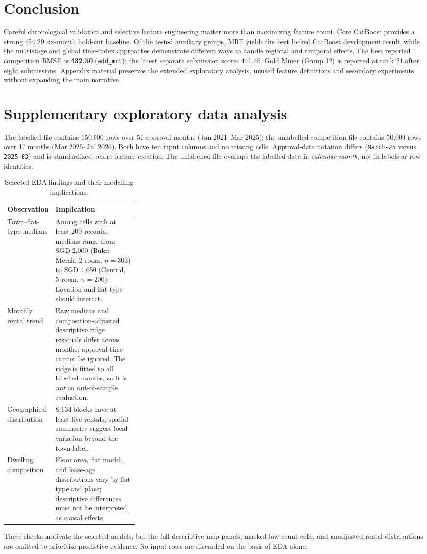 \documentclass[10pt,a4paper]{article}
\begin{document}
\section{Conclusion}\label{sec:conclusion}
Careful chronological validation and selective feature engineering matter more than maximizing feature count. Core CatBoost provides a strong 454.29 six-month hold-out baseline. Of the tested auxiliary groups, MRT yields the best locked CatBoost development result, while the multistage and global time-index approaches demonstrate different ways to handle regional and temporal effects. The best reported competition RMSE is \textbf{432.50} (\texttt{add\_mrt}); the latest separate submission scores 441.46. Gold Miner (Group 12) is reported at rank 21 after eight submissions. Appendix material preserves the extended exploratory analysis, unused feature definitions and secondary experiments without expanding the main narrative.

\clearpage
\appendix
\section{Supplementary exploratory data analysis}\label{app:eda}
The labelled file contains 150,000 rows over 51 approval months (Jan 2021--Mar 2025); the unlabelled competition file contains 50,000 rows over 17 months (Mar 2025--Jul 2026). Both have ten input columns and no missing cells. Approval-date notation differs (\texttt{March-25} versus \texttt{2025-03}) and is standardized before feature creation. The unlabelled file overlaps the labelled data in \emph{calendar month}, not in labels or row identities.

\begin{table}[htbp]\centering\small
\caption{Selected EDA findings and their modelling implications.}\label{tab:eda-summary}
\begin{tabularx}{\linewidth}{@{}p{0.31\linewidth}X@{}}\toprule
Observation & Implication \\\midrule
Town--flat-type medians & Among cells with at least 200 records, medians range from SGD 2,000 (Bukit Merah, 2-room, $n=303$) to SGD 4,650 (Central, 5-room, $n=200$). Location and flat type should interact.\\
Monthly rental trend & Raw medians and composition-adjusted descriptive ridge residuals differ across months; approval time cannot be ignored. The ridge is fitted to all labelled months, so it is \emph{not} an out-of-sample evaluation.\\
Geographical distribution & 8,134 blocks have at least five rentals; spatial summaries suggest local variation beyond the town label.\\
Dwelling composition & Floor area, flat model, and lease-age distributions vary by flat type and place; descriptive differences must not be interpreted as causal effects.\\\bottomrule
\end{tabularx}\end{table}
These checks motivate the selected models, but the full descriptive map panels, masked low-count cells, and unadjusted rental distributions are omitted to prioritize predictive evidence. No input rows are discarded on the basis of EDA alone.
\end{document}
